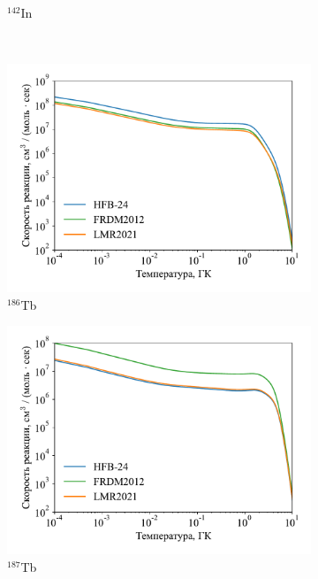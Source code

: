 \begin{figure}
\begin{subfigure}{0.48\textwidth}
    \caption{${}^{142}$In}
  \end{subfigure}
  \\
  \begin{subfigure}{0.48\textwidth}
    \centering
    \includegraphics[width=\textwidth]{../pics/rate_tb186.pdf}
    \caption{${}^{186}$Tb}
  \end{subfigure}
  \hfil
  \begin{subfigure}{0.48\textwidth}
    \centering
    \includegraphics[width=\textwidth]{../pics/rate_tb187.pdf}
    \caption{${}^{187}$Tb}
  \end{subfigure}
  \\
  \begin{subfigure}{0.48\textwidth}

\end{subfigure}
\end{figure}
